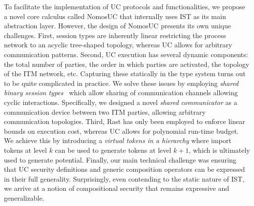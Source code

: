 To facilitate the implementation of UC protocols and functionalities, we propose a novel core calculus called NomosUC that
internally uses IST as its main abstraction layer.
However, the design of NomosUC presents its own unique challenges.
First, session types are inherently linear restricting the process network to an acyclic tree-shaped topology,
whereas UC allows for arbitrary communication patterns.
Second, UC execution has several dynamic components: the total number of parties, the order in which parties are activated,
the topology of the ITM network, etc.
Capturing these statically in the type system turns out to be quite complicated in practice.
We solve these issues by employing \emph{shared binary session types}~\cite{balzer2017manifest} which allow sharing
of communication channels allowing cyclic interactions.
Specifically, we designed a novel \emph{shared communicator} as a communication device between two ITM parties, allowing
arbitrary communication topologies.
Third, Rast has only been employed to enforce linear bounds on execution cost, whereas UC allows for polynomial run-time budget.
We achieve this by introducing a \emph{virtual tokens in a hierarchy} where import tokens at level $k$ can be used to generate
tokens at level $k+1$, which is ultimately used to generate potential.
Finally, our main technical challenge was ensuring that UC security definitions and generic composition operators
can be expressed in their full generality.
Surprisingly, even contending to the static nature of IST, we arrive at a notion of compositional security that remains expressive and generalizable.

